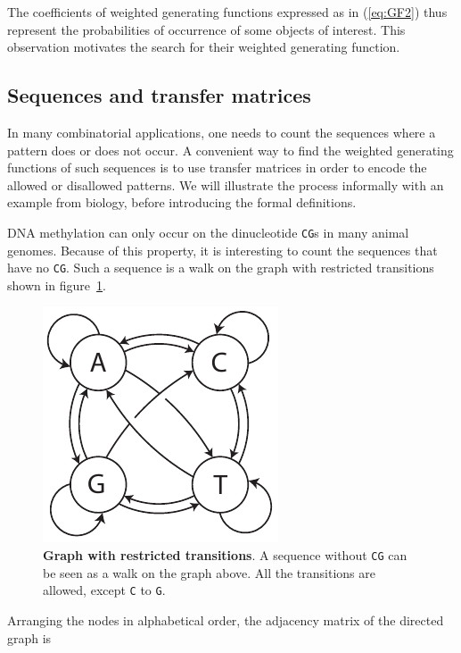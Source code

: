 \documentclass{article}
\begin{document}
The coefficients of weighted generating functions expressed as in
(\ref{eq:GF2}) thus represent the probabilities of occurrence of some
objects of interest. This observation motivates the search for
their weighted generating function.




\subsection{Sequences and transfer matrices}

In many combinatorial applications, one needs to count the sequences where
a pattern does or does not occur. A convenient way to find the weighted
generating functions of such sequences is to use transfer matrices in
order to encode the allowed or disallowed patterns. We will illustrate
the process informally with an example from biology, before introducing
the formal definitions.

DNA methylation can only occur on the dinucleotide \texttt{CG}s in many
animal genomes. Because of this property, it is interesting to count the
sequences that have no \texttt{CG}. Such a sequence is a walk on the
graph with restricted transitions shown in figure~\ref{fig:CG_transtions}.

\begin{figure}[h]
\centering
\includegraphics[scale=0.9]{CG_transitions.pdf}
\caption{\textbf{Graph with restricted transitions}.
A sequence without \texttt{CG} can be seen as a walk on the graph above.
All the transitions are allowed, except \texttt{C} to \texttt{G}.}
\label{fig:CG_transtions}
\end{figure}

Arranging the nodes in alphabetical order, the adjacency matrix of the
directed graph is
\end{document}

